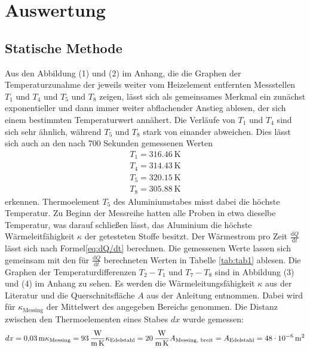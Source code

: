 \section{Auswertung}
\label{sec:Auswertung}


\subsection{Statische Methode}

Aus den Abbildung (1) und (2) im Anhang, die die Graphen der Temperaturzunahme der jeweils weiter vom Heizelement entfernten Messstellen $T_\text{1}$ und $T_\text{4}$ und $T_\text{5}$ und $T_\text{8}$ zeigen, lässt sich als gemeinsames Merkmal ein zunächst exponentieller und dann immer weiter abflachender Anstieg ablesen, der sich einem bestimmten Temperaturwert annähert.
Die Verläufe von $T_\text{1}$ und $T_\text{4}$ sind sich sehr ähnlich, während $T_\text{5}$ und $T_\text{8}$ stark von einander abweichen.\newline
Dies lässt sich auch an den nach 700 Sekunden gemessenen Werten
\begin{align*}
T_\text{1}=\SI{316.46}{\kelvin}\\
T_\text{4}=\SI{314.43}{\kelvin}\\
T_\text{5}=\SI{320.15}{\kelvin}\\
T_\text{8}=\SI{305.88}{\kelvin}
\end{align*}
erkennen.
Thermoelement $T_\text{5}$ des Aluminiumstabes misst dabei die höchste Temperatur.
Zu Beginn der Messreihe hatten alle Proben in etwa dieselbe Temperatur, was darauf schließen lässt, das Aluminium die höchste Wärmeleitfähigkeit $\kappa$ der getesteten Stoffe besitzt.
Der Wärmestrom pro Zeit $\frac{\mathrm{d}Q}{\mathrm{d}t}$
lässt sich nach Formel\eqref{eq:dQ/dt} berechnen. Die gemessenen Werte lassen sich gemeinsam mit den für $\frac{\mathrm{d}Q}{\mathrm{d}t}$ berechneten Werten in Tabelle \ref{tab:tab1} ablesen. Die Graphen der Temperaturdifferenzen $T_\text{2}-T_\text{1}$ und $T_\text{7}-T_\text{8}$ sind in Abbildung (3) und (4) im Anhang zu sehen.
Es werden die Wärmeleitungsfähigkeit $\kappa$ aus der Literatur\cite{kappa} und die Querschnitsfläche $A$ aus der Anleitung\cite{V204} entnommen. Dabei wird für $\kappa_\text{Messing}$ der Mittelwert des angegeben Bereichs genommen.
Die Distanz zwischen den Thermoelementen eines Stabes $dx$ wurde gemessen:
\[
dx = \SI{0.03}{\metre}\newline
\kappa_\text{Messing} = \SI{93}{\watt\per\metre\per\kelvin}\newline
\kappa_\text{Edelstahl} = \SI{20}{\watt\per\metre\per\kelvin}\newline
A_\text{Messing, breit} = A_\text{Edelstahl} =\SI{ 48e-6}{\metre\squared}
\]

